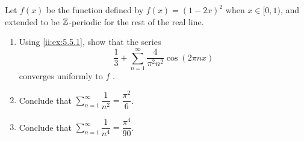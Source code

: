 \begin{ex}\label{ii:ex:5.5.2}
  Let \(f(x)\) be the function defined by \(f(x) = (1 - 2x)^2\) when \(x \in [0, 1)\), and extended to be \(\mathbb{Z}\)-periodic for the rest of the real line.
  \begin{enumerate}
    \item Using \cref{ii:ex:5.5.1}, show that the series
          \[
            \dfrac{1}{3} + \sum_{n = 1}^\infty \dfrac{4}{\pi^2 n^2} \cos(2 \pi n x)
          \]
          converges uniformly to \(f\) .
    \item Conclude that \(\sum_{n = 1}^\infty \dfrac{1}{n^2} = \dfrac{\pi^2}{6}\).
    \item Conclude that \(\sum_{n = 1}^\infty \dfrac{1}{n^4} = \dfrac{\pi^4}{90}\).
  \end{enumerate}
\end{ex}

